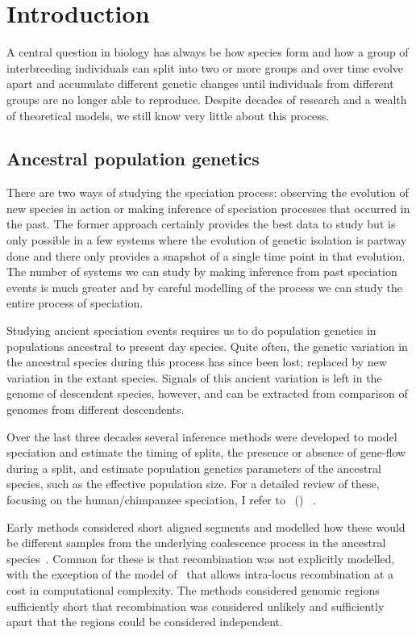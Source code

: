 
\chapter{Introduction}

A central question in biology has always be how species form and how a group of interbreeding individuals can split into two or more groups and over time evolve apart and accumulate different genetic changes until individuals from different groups are no longer able to reproduce. Despite decades of research and a wealth of theoretical models, we still know very little about this process.

\section{Ancestral population genetics}

There are two ways of studying the speciation process: observing the evolution of new species in action or making inference of speciation processes that occurred in the past. The former approach certainly provides the best data to study but is only possible in a few systems where the evolution of genetic isolation is partway done and there only provides a snapshot of a single time point in that evolution. The number of systems we can study by making inference from past speciation events is much greater and by careful modelling of the process we can study the entire process of speciation.

Studying ancient speciation events requires us to do population genetics in populations ancestral to present day species. Quite often, the genetic variation in the ancestral species during this process has since been lost; replaced by new variation in the extant species. Signals of this ancient variation is left in the genome of descendent species, however, and can be extracted from comparison of genomes from different descendents.

Over the last three decades several inference methods were developed to model speciation and estimate the timing of splits, the presence or absence of gene-flow during a split, and estimate population genetics parameters of the ancestral species, such as the effective population size. For a detailed review of these, focusing on the human/chimpanzee speciation, I refer to~\citeauthor{Mailund:2014gx} (\citeyear{Mailund:2014gx}) \emph{}~\citep{Mailund:2014gx}.

Early methods considered short aligned segments and modelled how these would be different samples from the underlying coalescence process in the ancestral species~\cite{Takahata1995Divergence-time,Innan2006The-effect-of-g,Burgess2008Estimation-of-h,Rannala2003,Yang2010,Yang2006,Yang2002,Becquet:2009ht,Wu:2004ib,Chen:2001dk,Wall2003}. Common for these is that recombination was not explicitly modelled, with the exception of the model of~\citet{Becquet2007A-new-approach-} that allows intra-locus recombination at a cost in computational complexity. The methods considered genomic regions sufficiently short that recombination was considered unlikely and sufficiently apart that the regions could be considered independent.

